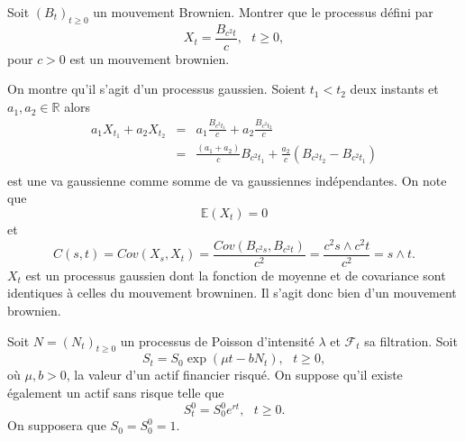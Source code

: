 \documentclass[11pt, addpoints, answers]{exam}
\newcommand{\R}{\mathbb{R}}            %
\newcommand{\E}{\mathbb E}            %
\begin{document}
\begin{questions}
\question[2] Soit $(B_t)_{t\geq 0}$ un mouvement Brownien. Montrer que le processus défini par 
$$
X_t =  \frac{B_{c^2t}}{c}, \text{ }t\geq 0,
$$
pour $c>0$ est un mouvement brownien.
\begin{solution}
On montre qu'il s'agit d'un processus gaussien. Soient $t_1<t_2$ deux instants et $a_1, a_2\in \R$ alors 
\begin{eqnarray*}
a_1X_{t_1}+ a_2X_{t_2} &=&  a_1\frac{B_{c^2t_1}}{c}+ a_2\frac{B_{c^2t_2}}{c}\\
&=&\frac{(a_1+a_2)}{c}B_{c^2t_1}+ \frac{a_2}{c}(B_{c^2t_2}-B_{c^2t_1})\\
\end{eqnarray*}
est une va gaussienne comme somme de va gaussiennes indépendantes. On note que 
$$
\E(X_t) = 0
$$
et 
$$
C(s,t) = Cov(X_s, X_t) = \frac{Cov(B_{c^2s}, B_{c^2t})}{c^2} = \frac{c^2s\land c^2t}{c^2} = s\land t.
$$
$X_t$ est un processus gaussien dont la fonction de moyenne et de covariance sont identiques à celles du mouvement browninen. Il s'agit donc bien d'un mouvement brownien. 
\end{solution}

\question Soit $N = (N_t)_{t\geq 0}$ un processus de Poisson d'intensité $\lambda$ et $\mathcal{F}_t$ sa filtration. Soit 
$$
S_t = S_0\exp(\mu t - bN_t),\text{ } t\geq 0, 
$$
où $\mu, b>0$, la valeur d'un actif financier risqué. On suppose qu'il existe également un actif sans risque telle que 
$$
S_t^0 = S_0^0e^{rt},\text{ }t\geq0.
$$
On supposera que $S_0 = S_0^0 = 1$.
\end{questions}
\end{document}
